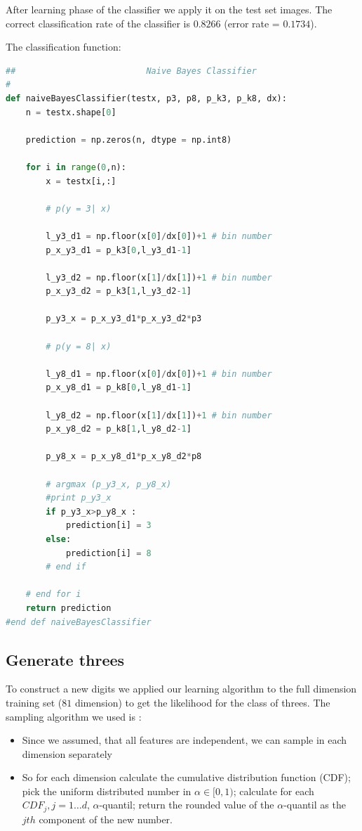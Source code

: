 \documentclass{article}
\begin{document}
\FloatBarrier

After learning phase of the classifier we apply it on the test set images. The correct classification rate of the classifier is $0.8266$ (error rate = $0.1734$).

The classification function: 
\begin{lstlisting}[language=Python]
##                          Naive Bayes Classifier
#
def naiveBayesClassifier(testx, p3, p8, p_k3, p_k8, dx):
    n = testx.shape[0]
    
    prediction = np.zeros(n, dtype = np.int8)
        
    for i in range(0,n):
        x = testx[i,:]
        
        # p(y = 3| x)
        
        l_y3_d1 = np.floor(x[0]/dx[0])+1 # bin number
        p_x_y3_d1 = p_k3[0,l_y3_d1-1]

        l_y3_d2 = np.floor(x[1]/dx[1])+1 # bin number
        p_x_y3_d2 = p_k3[1,l_y3_d2-1]
        
        p_y3_x = p_x_y3_d1*p_x_y3_d2*p3
        
        # p(y = 8| x)

        l_y8_d1 = np.floor(x[0]/dx[0])+1 # bin number
        p_x_y8_d1 = p_k8[0,l_y8_d1-1]

        l_y8_d2 = np.floor(x[1]/dx[1])+1 # bin number
        p_x_y8_d2 = p_k8[1,l_y8_d2-1]
        
        p_y8_x = p_x_y8_d1*p_x_y8_d2*p8
        
        # argmax (p_y3_x, p_y8_x) 
        #print p_y3_x
        if p_y3_x>p_y8_x :
            prediction[i] = 3
        else:
            prediction[i] = 8
        # end if        
        
    # end for i
    return prediction
#end def naiveBayesClassifier
\end{lstlisting}

\subsection{Generate threes}
To construct a new digits we applied our learning algorithm to the full dimension training set ($81$ dimension) to get the likelihood for the class of threes. The sampling algorithm we used is : 
	\begin{itemize}
	\item Since we assumed, that all features are independent, we can sample in each dimension separately
	\item So for each dimension calculate the cumulative distribution function (CDF); pick the uniform distributed number 	in $\alpha\in[0,1)$; calculate for each $CDF_j, j=1\dots d$, $\alpha$-quantil; return the rounded value of the $\alpha$-quantil as the $j{th}$ component of the new number.
	\end{itemize}	
\end{document}
